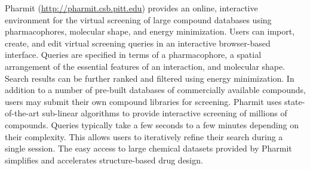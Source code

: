 Pharmit (\url{http://pharmit.csb.pitt.edu}) provides an online, interactive environment for the virtual screening of large compound databases using pharmacophores, molecular shape, and energy minimization.  Users can import, create, and edit virtual screening queries in an interactive browser-based interface.  Queries are specified in terms of a pharmacophore, a spatial arrangement of the essential features of an interaction, and molecular shape.  Search results can be further ranked and filtered using energy minimization.  
In addition to a number of pre-built databases of commercially available compounds, users may submit their own compound libraries for screening.  Pharmit uses state-of-the-art sub-linear algorithms to provide interactive screening of millions of compounds. Queries typically take a few seconds to a few minutes depending on their complexity. This allows users to iteratively refine their search during a single session.  The easy access to large chemical datasets provided by Pharmit simplifies and accelerates structure-based drug design.
